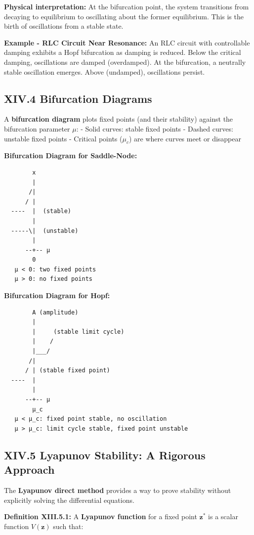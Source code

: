 \documentclass[
]{article}
\begin{document}
\textbf{Physical interpretation:} At the bifurcation point, the system
transitions from decaying to equilibrium to oscillating about the former
equilibrium. This is the birth of oscillations from a stable state.

\textbf{Example - RLC Circuit Near Resonance:} An RLC circuit with
controllable damping exhibits a Hopf bifurcation as damping is reduced.
Below the critical damping, oscillations are damped (overdamped). At the
bifurcation, a neutrally stable oscillation emerges. Above (undamped),
oscillations persist.

\subsection{XIV.4 Bifurcation
Diagrams}\label{xiv.4-bifurcation-diagrams}

A \textbf{bifurcation diagram} plots fixed points (and their stability)
against the bifurcation parameter \(\mu\): - Solid curves: stable fixed
points - Dashed curves: unstable fixed points - Critical points
(\(\mu_c\)) are where curves meet or disappear

\textbf{Bifurcation Diagram for Saddle-Node:}

\begin{verbatim}
        x
        |
       /|
      / |
  ----  |  (stable)
        |
  -----\|  (unstable)
        |
      --+-- μ
        0
   μ < 0: two fixed points
   μ > 0: no fixed points
\end{verbatim}

\textbf{Bifurcation Diagram for Hopf:}

\begin{verbatim}
        A (amplitude)
        |
        |     (stable limit cycle)
        |    /
        |___/
       /|
      / | (stable fixed point)
  ----  |
        |
      --+-- μ
        μ_c
   μ < μ_c: fixed point stable, no oscillation
   μ > μ_c: limit cycle stable, fixed point unstable
\end{verbatim}

\subsection{XIV.5 Lyapunov Stability: A Rigorous
Approach}\label{xiv.5-lyapunov-stability-a-rigorous-approach}

The \textbf{Lyapunov direct method} provides a way to prove stability
without explicitly solving the differential equations.

\textbf{Definition XIII.5.1:} A \textbf{Lyapunov function} for a fixed
point \(\mathbf{z}^*\) is a scalar function \(V(\mathbf{z})\) such that:
\end{document}
